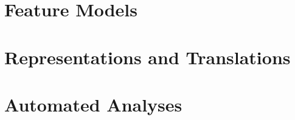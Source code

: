 

\subtitle{4. Feature Modeling}
\author{Elias Kuiter}





\section{Feature Models}



\lessonslearned{
	\item \ldots
}{
	\item \ldots
}{
	\ldots
}

\sectionend

\section{Representations and Translations}



\lessonslearned{
	\item \ldots
}{
	\item \ldots
}{
	\ldots
}

\sectionend

\section{Automated Analyses}



\lessonslearned{
	\item \ldots
}{
	\item \ldots
}{
	\ldots
}




